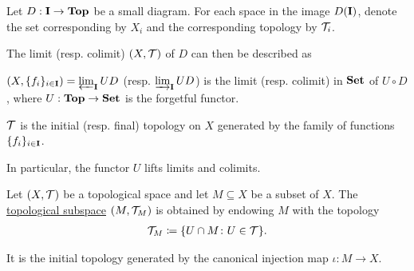 \begin{proposition}\label{thm:initial_final_topology_limit}\cite{nLab:top}
  Let $D: \operatorname{\mathbf{I}} \to \operatorname{\mathbf{Top}}$ be a small diagram. For each space in the image $D(\operatorname{\mathbf{I}})$, denote the set corresponding by $X_i$ and the corresponding topology by $\mathcal T_i$.

  The limit (resp. colimit) $(X, \mathcal T)$ of $D$ can then be described as
  \begin{defenum}
    \item $(X, \{ f_i \}_{i \in \operatorname{\mathbf{I}}}) = \varprojlim_{\operatorname{\mathbf{I}}} UD$ (resp. $\varinjlim_{\operatorname{\mathbf{I}}} UD$) is the limit (resp. colimit) in $\operatorname{\mathbf{Set}}$ of $U \circ D$, where $U: \operatorname{\mathbf{Top}} \to \operatorname{\mathbf{Set}}$ is the forgetful functor.
    \item $\mathcal T$ is the initial (resp. final) topology on $X$ generated by the family of functions $\{ f_i \}_{i \in \operatorname{\mathbf{I}}}$.
  \end{defenum}

  In particular, the functor $U$ lifts limits and colimits.
\end{proposition}

\begin{definition}\label{def:topological_subspace}
  Let $(X, \mathcal T)$ be a topological space and let $M \subseteq X$ be a subset of $X$. The \uline{topological subspace} $(M, \mathcal T_M)$ is obtained by endowing $M$ with the topology
  \begin{align*}
    \mathcal T_M \coloneqq \{ U \cap M \colon U \in \mathcal T \}.
  \end{align*}

  It is the initial topology generated by the canonical injection map $\iota: M \to X$.
\end{definition}

